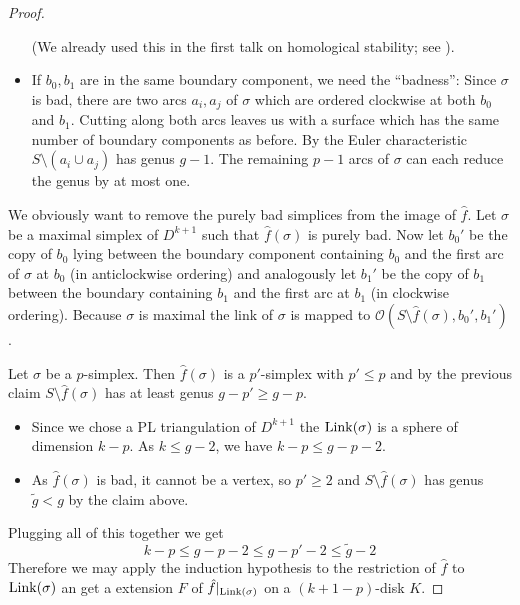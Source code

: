 \begin{proof}
\begin{itemize}[itemsep=0pt]
		(We already used this in the first talk on homological stability; see \textcite[Prop.2.2]{wahlHomological}).
		\item If $b_0,b_1$ are in the same boundary component, we need the \enquote{badness}:
		Since $\sigma$ is bad, there are two arcs $a_i, a_j$ of $\sigma$ which are ordered clockwise at both $b_0$ and $b_1$.
		Cutting along both arcs leaves us with a surface which has the same number of boundary components as before.
		By the Euler characteristic $S \setminus (a_i \cup a_j)$ has genus $g-1$.
		The remaining $p-1$ arcs of $\sigma$ can each reduce the genus by at most one.
	\end{itemize}
	We obviously want to remove the purely bad simplices from the image of $\hat{f}$.
	Let $\sigma$ be a maximal simplex of $D^{k+1}$ such that $\hat{f}(\sigma)$ is purely bad.
	Now let $b_0'$ be the copy of $b_0$ lying between the boundary component containing $b_0$ and the first arc of $\sigma$ at $b_0$ (in anticlockwise ordering) and analogously let $b_1'$ be the copy of $b_1$ between the boundary containing $b_1$ and the first arc at $b_1$ (in clockwise ordering).
	Because $\sigma$ is maximal the link of $\sigma$ is mapped to $\mathcal{O}(S\setminus \hat{f}(\sigma),b_0',b_1')$.
	
	Let $\sigma$ be a $p$-simplex.
	Then $\hat{f}(\sigma)$ is a $p'$-simplex with $p' \le p$ and by the previous claim $S \setminus \hat{f}(\sigma)$ has at least genus $g- p' \ge g- p$.
	\begin{itemize}[itemsep=0pt]
		\item Since we chose a PL triangulation of $D^{k+1}$ the $\operatorname{Link}(\sigma)$ is a sphere of dimension $k-p$.
		As $k \le g-2$, we have $k-p \le g -p -2$.
		\item As $\hat{f}(\sigma)$ is bad, it cannot be a vertex, so $p' \ge 2$ and $S \setminus \hat{f}(\sigma)$ has genus $\tilde{g} < g$ by the claim above.
	\end{itemize}
	Plugging all of this together we get
	\[
		k-p \le g- p -2 \le g- p' -2 \le \tilde{g} -2
	\]
	Therefore we may apply the induction hypothesis to the restriction of $\hat{f}$ to $\operatorname{Link}(\sigma)$ an get a extension $F$ of $\hat{f}|_{\operatorname{Link}(\sigma)}$ on a $(k+1-p)$-disk $K$.
\end{proof}